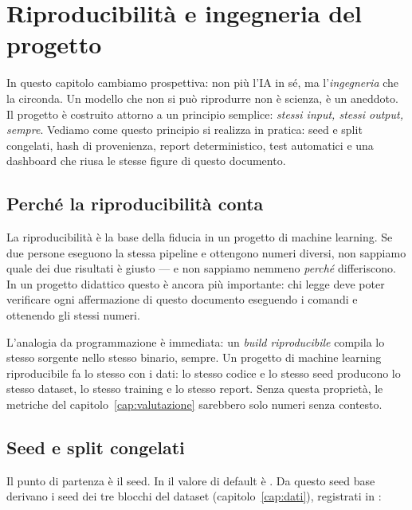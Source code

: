 
\chapter{Riproducibilità e ingegneria del progetto}\label{cap:riproducibilita}

In questo capitolo cambiamo prospettiva: non più l'IA in sé, ma
l'\emph{ingegneria} che la circonda. Un modello che non si può riprodurre
non è scienza, è un aneddoto. Il progetto \progetto{} è costruito attorno a
un principio semplice: \emph{stessi input, stessi output, sempre}. Vediamo
come questo principio si realizza in pratica: seed e split congelati, hash
di provenienza, report deterministico, test automatici e una dashboard che
riusa le stesse figure di questo documento.

\section{Perché la riproducibilità conta}\label{sec:perche-riproducibilita}

La riproducibilità è la base della fiducia in un progetto di machine
learning. Se due persone eseguono la stessa pipeline e ottengono numeri
diversi, non sappiamo quale dei due risultati è giusto — e non sappiamo
nemmeno \emph{perché} differiscono. In un progetto didattico questo è
ancora più importante: chi legge deve poter verificare ogni affermazione
di questo documento eseguendo i comandi e ottenendo gli stessi numeri.

L'analogia da programmazione è immediata: un \emph{build riproducibile}
compila lo stesso sorgente nello stesso binario, sempre. Un progetto di
machine learning riproducibile fa lo stesso con i dati: lo stesso codice e
lo stesso seed producono lo stesso dataset, lo stesso training e lo stesso
report. Senza questa proprietà, le metriche del capitolo~\ref{cap:valutazione}
sarebbero solo numeri senza contesto.

\section{Seed e split congelati}\label{sec:seed-split-congelati}

Il punto di partenza è il seed. In 
il valore di default è . Da questo seed base
derivano i seed dei tre blocchi del dataset (capitolo~\ref{cap:dati}),
registrati in :

